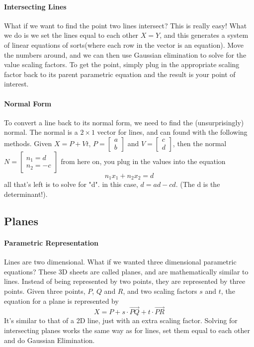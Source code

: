 \paragraph{Intersecting Lines} What if we want to find the point two lines intersect? This is really easy! What we do is we set the lines equal to each other $X = Y$, and this generates a system of linear equations of sorts(where each row in the vector is an equation). Move the numbers around, and we can then use Gaussian elimination to solve for the value scaling factors. To get the point, simply plug in the appropriate scaling factor back to its parent parametric equation and the result is your point of interest.

\paragraph{Normal Form} To convert a line back to its normal form, we need to find the (unsurprisingly) normal. The normal is a $2 \times 1$ vector for lines, and can found with the following methods. Given $X = P + Vt$, $P = \begin{bmatrix}
a \\ b
\end{bmatrix}$ and $V = \begin{bmatrix}
c \\ d
\end{bmatrix}$, then the normal $N = \begin{bmatrix}
n_1 = d \\ n_2 = -c
\end{bmatrix}$ from here on, you plug in the values into the equation \[n_1x_1 + n_2x_2 = d\] all that's left is to solve for "d". in this case, $d = ad - cd$. (The d is the determinant!).

\subsection{Planes}
\paragraph{Parametric Representation} Lines are two dimensional. What if we wanted three dimensional parametric equations? These 3D sheets are called planes, and are mathematically similar to lines. Instead of being represented by two points, they are represented by three points. Given three points, $P$, $Q$ and $R$, and two scaling factors $s$ and $t$, the equation for a plane is represented by \[X = P + s \cdot \overrightarrow{PQ} + t \cdot \overrightarrow{PR}\] It's similar to that of a 2D line, just with an extra scaling factor. Solving for intersecting planes works the same way as for lines, set them equal to each other and do Gaussian Elimination.
